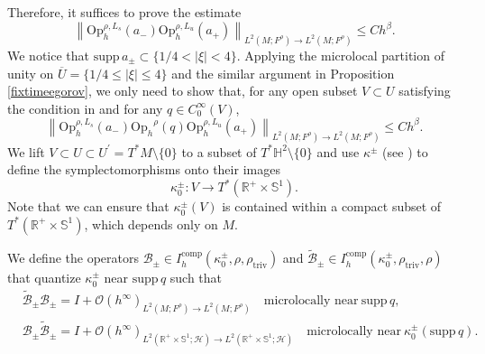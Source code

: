 \documentclass[11pt,oneside,reqno]{amsart}
\newcommand\Oph{\ensuremath{\mathrm{Op}_h}}
\theoremstyle{definition}
\numberwithin{equation}{section}
\theoremstyle{plain}
\begin{document}
Therefore, it suffices to prove the estimate
\begin{equation}
\left\|\mathrm{Op}_h^{\rho, L_s}(a_-) \mathrm{Op}_h^{\rho, L_u}(a_+)\right\|_{L^2(M;F^\rho) \rightarrow L^2(M;F^\rho)} \leq C h^\beta.
\end{equation}
We notice that $\mathrm{supp}\,a_{\pm}\subset \{1/4<|\xi|<4\}$. Applying the microlocal partition of unity on $\overline{U}=\{1/4\leq |\xi|\leq 4\}$ and the similar argument in Proposition \ref{fixtimeegorov}, we only need to show that, for any open subset $V\subset U$ satisfying the condition in \cite[(5.10)]{dyatlov2018semiclassical} and for any $q \in C_{0}^{\infty}(V)$, 
\begin{equation*}
    \left\|\mathrm{Op}_h^{\rho, L_s}(a_-) \Oph^{\rho}(q)\mathrm{Op}_h^{\rho, L_u}(a_+)\right\|_{L^2(M;F^\rho) \rightarrow L^2(M;F^\rho)} \leq C h^\beta.
\end{equation*}
We lift $V \subset U\subset U^{\prime}=T^*M\setminus \{0\}$ to a subset of $T^* \mathbb{H}^2 \setminus \{0\}$ and use $\kappa^{ \pm}$ (see \cite{dyatlovzahl2016spectral}) to define the symplectomorphisms onto their images
\begin{equation*}
    \kappa_0^{ \pm}: V \rightarrow T^*(\mathbb{R}^{+} \times \mathbb{S}^1).
\end{equation*}
Note that we can ensure that $\kappa_0^{ \pm}(V)$ is contained within a compact subset of $T^*(\mathbb{R}^{+} \times \mathbb{S}^1)$, which depends only on $M$.

We define the operators $\mathcal{B}_{ \pm} \in I^{\mathrm{comp}}_h(\kappa_0^{ \pm},\rho,\rho_{\mathrm{triv}})$ and $\widetilde{\mathcal{B}}_{ \pm} \in I^{\mathrm{comp}}_h(\kappa_0^{ \pm},\rho_{\mathrm{triv}},\rho)$ that quantize $\kappa_{0}^{\pm}$ near $\mathrm{supp}\,q$ such that 
\begin{equation}
\begin{aligned}
&\widetilde{\mathcal{B}}_{ \pm}\mathcal{B}_{ \pm}=I+\mathcal{O}(h^{\infty})_{L^2(M;F^{\rho})\to L^2(M;F^{\rho})} \quad \text{microlocally near} \ \mathrm{supp}\,q ,\\
&\mathcal{B}_{ \pm}\widetilde{\mathcal{B}}_{ \pm}=I+\mathcal{O}(h^{\infty})_{L^2(\mathbb{R}^{+} \times \mathbb{S}^1;\mathcal{H})\to L^2(\mathbb{R}^{+} \times \mathbb{S}^1;\mathcal{H})} \quad \text{microlocally near} \ \kappa_0^{ \pm}(\mathrm{supp}\,q).
\end{aligned}
\end{equation}
\end{document}
